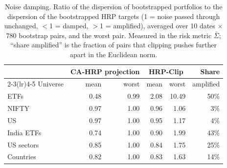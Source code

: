 \begin{table}[!htbp]\centering\small
\caption{Noise damping. Ratio of the dispersion of bootstrapped portfolios to the dispersion of the bootstrapped HRP targets (1 = noise passed through unchanged, $<$1 = damped, $>$1 = amplified), averaged over 10 dates $\times$ 780 bootstrap pairs, and the worst pair. Measured in the risk metric $\bar\Sigma$; ``share amplified'' is the fraction of pairs that clipping pushes further apart in the Euclidean norm.}\label{tab:noise}
\setlength{\tabcolsep}{4pt}\begin{tabular}{l rr rr r}\toprule
 & \multicolumn{2}{c}{CA-HRP projection} & \multicolumn{2}{c}{HRP-Clip} & Share\\
\cmidrule(lr){2-3}\cmidrule(lr){4-5}
Universe & mean & worst & mean & worst & amplified\\\midrule
ETFs & 0.48 & 0.99 & 2.08 & 10.49 & 50\%\\
NIFTY & 0.97 & 1.00 & 0.96 & 1.06 & 3\%\\
US & 0.97 & 1.00 & 0.95 & 1.17 & 4\%\\
India ETFs & 0.74 & 1.00 & 0.90 & 1.99 & 43\%\\
US sectors & 0.85 & 1.00 & 0.84 & 1.75 & 25\%\\
Countries & 0.82 & 1.00 & 0.83 & 1.63 & 14\%\\
\bottomrule\end{tabular}\end{table}